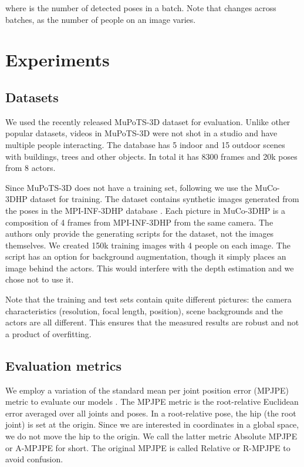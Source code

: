 \documentclass[conference]{IEEEtran}
\begin{document}
where  is the number of detected poses in a batch. Note that  changes across batches, as the number of people on an image varies.

\section{Experiments}\label{sec:experiments}

\subsection{Datasets}
We used the recently released MuPoTS-3D dataset \cite{mehta2018single_shot} for evaluation. Unlike other popular datasets, videos in MuPoTS-3D were not shot in a studio and have multiple people interacting. The database has 5 indoor and 15 outdoor scenes with buildings, trees and other objects. In total it has 8300 frames and 20k poses from 8 actors.

Since MuPoTS-3D does not have a training set, following \cite{mehta2018single_shot} we use the MuCo-3DHP dataset \cite{mehta2018single_shot} for training. The dataset contains synthetic images generated from the poses in the MPI-INF-3DHP database \cite{mehta}. Each picture in MuCo-3DHP is a composition of 4 frames from MPI-INF-3DHP from the same camera. The authors only provide the generating scripts for the dataset, not the images themselves. We created 150k training images with 4 people on each image. The script has an option for background augmentation, though it simply places an image behind the actors. This would interfere with the depth estimation and we chose not to use it.

Note that the training and test sets contain quite different pictures: the camera characteristics (resolution, focal length, position), scene backgrounds and the actors are all different. This ensures that the measured results are robust and not a product of overfitting.

\subsection{Evaluation metrics}

We employ a variation of the standard  mean per joint position error (MPJPE) metric to evaluate our models \cite{h36m}. The MPJPE metric is the root-relative Euclidean error averaged over all joints and poses. In a root-relative pose, the hip (the root joint) is set at the origin. Since we are interested in coordinates in a global space, we do not move the hip to the origin. We call the latter metric Absolute MPJPE or A-MPJPE for short. The original MPJPE is called Relative or R-MPJPE to avoid confusion.
\end{document}
